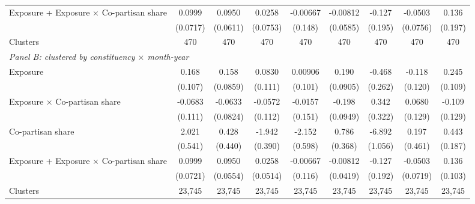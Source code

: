 {\begin{tabular}{l*{8}{c}}
Exposure + Exposure $\times$ Co-partisan share&      0.0999         &      0.0950         &      0.0258         &    -0.00667         &    -0.00812         &      -0.127         &     -0.0503         &       0.136         \\
            &    (0.0717)         &    (0.0611)         &    (0.0753)         &     (0.148)         &    (0.0585)         &     (0.195)         &    (0.0756)         &     (0.197)         \\
Clusters    &         470         &         470         &         470         &         470         &         470         &         470         &         470         &         470         \\
\midrule

\multicolumn{9}{l}{\textit{Panel B: clustered by constituency $\times$ month-year}} \\
Exposure    &       0.168         &       0.158\sym{*}  &      0.0830         &     0.00906         &       0.190\sym{**} &      -0.468\sym{*}  &      -0.118         &       0.245\sym{**} \\
            &     (0.107)         &    (0.0859)         &     (0.111)         &     (0.101)         &    (0.0905)         &     (0.262)         &     (0.120)         &     (0.109)         \\
Exposure $\times$ Co-partisan share&     -0.0683         &     -0.0633         &     -0.0572         &     -0.0157         &      -0.198\sym{**} &       0.342         &      0.0680         &      -0.109         \\
            &     (0.111)         &    (0.0824)         &     (0.112)         &     (0.151)         &    (0.0949)         &     (0.322)         &     (0.129)         &     (0.129)         \\
Co-partisan share&       2.021\sym{***}&       0.428         &      -1.942\sym{***}&      -2.152\sym{***}&       0.786\sym{**} &      -6.892\sym{***}&       0.197         &       0.443\sym{**} \\
            &     (0.541)         &     (0.440)         &     (0.390)         &     (0.598)         &     (0.368)         &     (1.056)         &     (0.461)         &     (0.187)         \\

Exposure + Exposure $\times$ Co-partisan share&      0.0999         &0.0950\sym{*}         &      0.0258         &    -0.00667         &    -0.00812         &      -0.127         &     -0.0503         &       0.136         \\
            &    (0.0721)         &    (0.0554)         &    (0.0514)         &     (0.116)         &    (0.0419)         &     (0.192)         &    (0.0719)         &     (0.103)         \\
Clusters    &      23,745         &      23,745         &      23,745         &      23,745         &      23,745         &      23,745         &      23,745         &      23,745         \\
\midrule


\end{tabular}}
